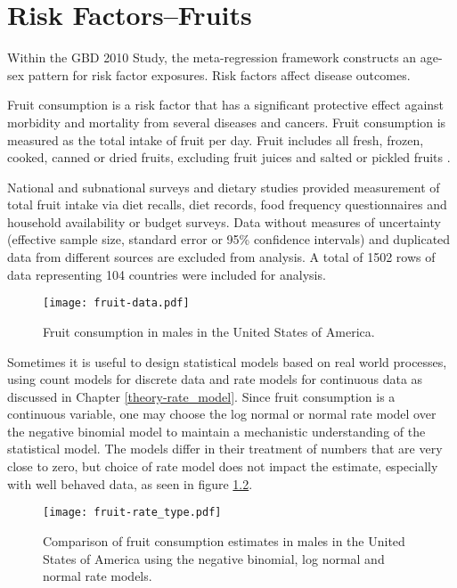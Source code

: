 \chapter{Risk Factors--Fruits}
\label{applications-log_normal}

Within the GBD 2010 Study, the meta-regression framework constructs an age-sex pattern for risk factor exposures.  Risk factors affect disease outcomes.

Fruit consumption is a risk factor that has a significant protective effect against morbidity and mortality from several diseases and cancers.  Fruit consumption is measured as the total intake of fruit per day.  Fruit includes all fresh, frozen, cooked, canned or dried fruits, excluding fruit juices and salted or pickled fruits \cite{he_increased_2007, boeing_intake_2006}.

National and subnational surveys and dietary studies provided measurement of total fruit intake via diet recalls, diet records, food frequency questionnaires and household availability or budget surveys.  Data without measures of uncertainty (effective sample size, standard error or 95\% confidence intervals) and duplicated data from different sources are excluded from analysis.  A total of 1502 rows of data representing 104 countries were included for analysis.

    \begin{figure}[h]
        \begin{center}
            \texttt{[image: fruit-data.pdf]}
            \caption{Fruit consumption in males in the United States of America.}
            \label{fig:app-fruit data}
        \end{center}
    \end{figure}

Sometimes it is useful to design statistical models based on real world processes, using count models for discrete data and rate models for continuous data as discussed in Chapter \ref{theory-rate_model}.  Since fruit consumption is a continuous variable, one may choose the log normal or normal rate model over the negative binomial model to maintain a mechanistic understanding of the statistical model.  The models differ in their treatment of numbers that are very close to zero, but choice of rate model does not impact the estimate, especially with well behaved data, as seen in figure \ref{fig:app-fruit rate type}.

    \begin{figure}[h]
        \begin{center}
            \texttt{[image: fruit-rate\_type.pdf]}
            \caption{Comparison of fruit consumption estimates in males in the United States of America using the negative binomial, log normal and normal rate models.}
            \label{fig:app-fruit rate type}
        \end{center}
    \end{figure}